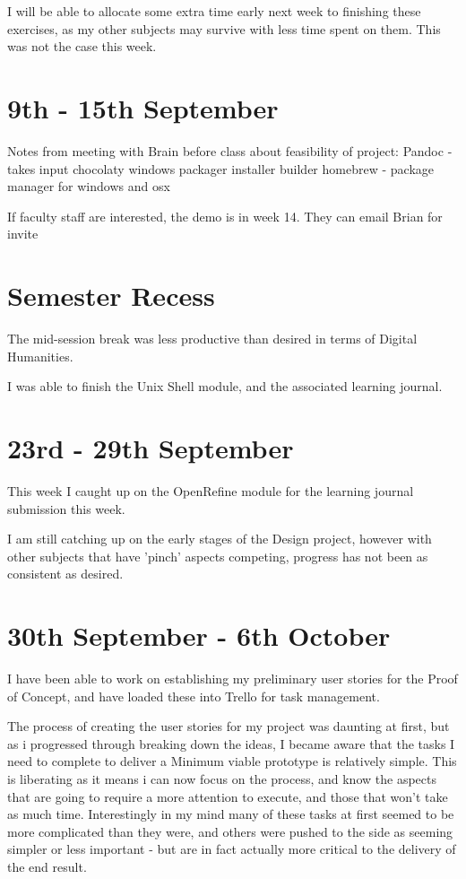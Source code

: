 \documentclass{article}
\begin{document}
I will be able to allocate some extra time early next week to finishing these exercises, as my other subjects may survive with less time spent on them. This was not the case this week.

\section{9th - 15th September}
Notes from meeting with Brain before class about feasibility of project:
Pandoc - takes input 
chocolaty windows packager installer builder
homebrew - package manager for windows and osx

If faculty staff are interested, the demo is in week 14. They can email Brian for invite


\section*{Semester Recess}
The mid-session break was less productive than desired in terms of Digital Humanities.

I was able to finish the Unix Shell module, and the associated learning journal. 

\section{23rd - 29th September}
This week I caught up on the OpenRefine module for the learning journal submission this week. 

I am still catching up on the early stages of the Design project, however with other subjects that have 'pinch' aspects competing, progress has not been as consistent as desired.

\section{30th September - 6th October}

I have been able to work on establishing my preliminary user stories for the Proof of Concept, and have loaded these into Trello for task management.

The process of creating the user stories for my project was daunting at first, but as i progressed through breaking down the ideas, I became aware that the tasks I need to complete to deliver a Minimum viable prototype is relatively simple. This is liberating as it means i can now focus on the process, and know the aspects that are going to require a more attention to execute, and those that won't take as much time. Interestingly in my mind many of these tasks at first seemed to be more complicated than they were, and others were pushed to the side as seeming simpler or less important - but are in fact actually more critical to the delivery of the end result.
\end{document}
